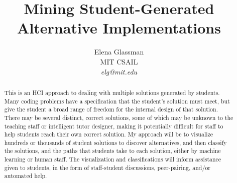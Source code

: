 \documentclass[12pt]{article}
\begin{document}
\title{Mining Student-Generated Alternative Implementations}

\author{Elena Glassman \\ MIT CSAIL \\ \textit{elg@mit.edu}
}

\maketitle

\begin{abstract}
This is an HCI approach to dealing with multiple solutions generated by students. Many coding problems have a specification that the student's solution must meet, but give the student a broad range of freedom for the internal design of that solution. There may be several distinct, correct solutions, some of which may be unknown to the teaching staff or intelligent tutor designer, making it potentially difficult for staff to help students reach their own correct solution. My approach will be to visualize hundreds or thousands of student solutions to discover alternatives, and then classify the solutions, and the paths that students take to each solution, either by machine learning or human staff. The visualization and classifications will inform assistance given to students, in the form of staff-student discussions, peer-pairing, and/or automated help.

\end{abstract}
\end{document}
